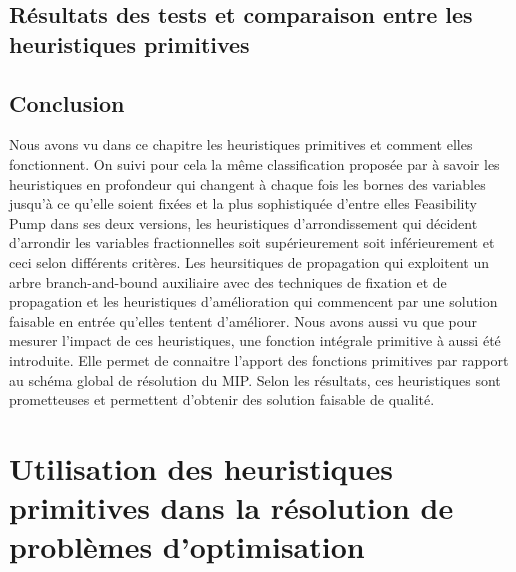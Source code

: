 \documentclass[12pt,a4paper,oneside]{book}
\theoremstyle{definition}
\begin{document}
	\section{Résultats des tests et comparaison entre les heuristiques primitives}
	
	
	
	\section{Conclusion}
	Nous avons vu dans ce chapitre les heuristiques primitives et comment elles fonctionnent. On suivi pour cela la même classification proposée par \cite{berthold2006} à savoir les heuristiques en profondeur qui changent à chaque fois les bornes des variables jusqu'à ce qu'elle soient fixées et la plus sophistiquée d'entre elles Feasibility Pump dans ses deux versions, les heuristiques d'arrondissement qui décident d'arrondir les variables fractionnelles soit supérieurement soit inférieurement et ceci selon différents critères. Les heursitiques de propagation qui exploitent un arbre branch-and-bound auxiliaire avec des techniques de fixation et de propagation et les heuristiques d'amélioration qui commencent par une solution faisable en entrée qu'elles tentent d'améliorer. Nous avons aussi vu que pour mesurer l'impact de ces heuristiques, une fonction intégrale primitive à aussi été introduite. Elle permet de connaitre l'apport des fonctions primitives par rapport au schéma global de résolution du MIP. Selon les résultats, ces heuristiques sont prometteuses et permettent d'obtenir des solution faisable de qualité. 
	
	\chapter{Utilisation des heuristiques primitives dans la résolution de problèmes d'optimisation}
	
\end{document}

